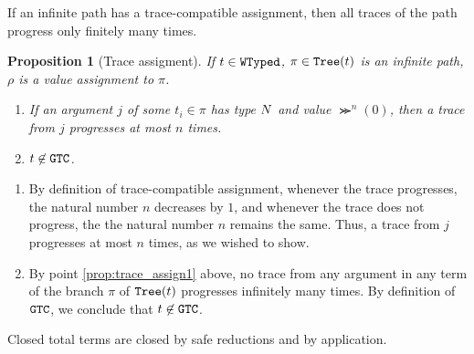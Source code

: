 \documentclass{article}
\newtheorem{proposition}[theorem]{Proposition}
\newenvironment{proof}[1][Proof]{\begin{trivlist}
\item[\hskip \labelsep {\bfseries #1}]}{\end{trivlist}}
\begin{document}
If an infinite path has a trace-compatible assignment, then all traces of the path progress only finitely many times.

\begin{proposition}[Trace assigment]
\label{prop:trace_assign}
If $t \in {\tt WTyped}$, $\pi \in {\tt Tree}(t)$ is an infinite path, $\rho$ is a value assignment to $\pi$.
\begin{enumerate}
\item
\label{prop:trace_assign1}
If an argument $j$ of some $t_i \in \pi$ has type ${N}$ and value $\Succ^n(0)$, then a trace
from $j$ progresses at most $n$ times.
\item
\label{prop:trace_assign2}
$t \not \in {\tt GTC}$.
\end{enumerate}
\end{proposition}

\begin{proof}
\begin{enumerate}
\item
By definition of trace-compatible assignment, whenever the trace progresses, 
the natural number $n$ decreases by $1$,
and whenever the trace does not progress, the the natural number $n$ remains the same.
Thus, a trace from $j$ progresses at most $n$ times, as we wished to show.
\item
By point \ref{prop:trace_assign1} above, 
no trace from any argument in any term of the branch $\pi$ of ${\tt Tree}(t)$ progresses infinitely many times.
By definition of ${\tt GTC}$, we conclude that $t \not \in {\tt GTC}$. 
\end{enumerate}
\end{proof}

Closed total terms are closed by safe reductions and by application. 
\end{document}
